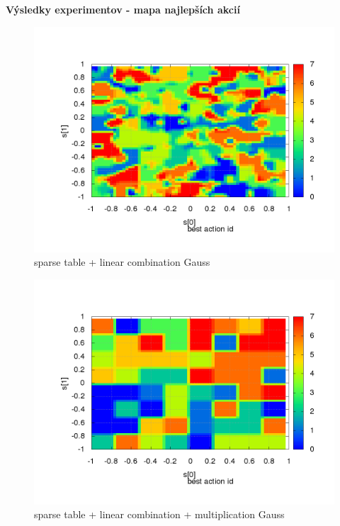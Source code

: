 \documentclass[xcolor=dvipsnames]{beamer}
\begin{document}
\begin{frame}{\bf Výsledky experimentov - mapa najlepších akcií}

\begin{minipage}{.5\textwidth}

\begin{figure}[!htb]
\centering
\includegraphics[scale=.2]{../../results_q_learning/map_1/function_type_3/iterations_10/action_best_value_log_surface.png}
\caption{sparse table + linear combination Gauss}
\end{figure}


\end{minipage}%
\begin{minipage}{.5\textwidth}

\begin{figure}[!htb]
\centering
\includegraphics[scale=.2]{../../results_q_learning/map_1/function_type_4/iterations_10/action_best_value_log_surface.png}
\caption{sparse table + linear combination + multiplication Gauss}
\end{figure}


\end{minipage}
\end{frame}
\end{document}
